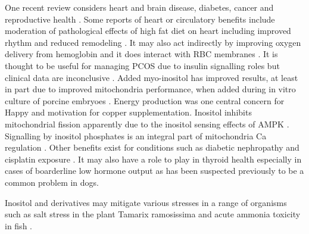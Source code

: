 One recent review considers heart and brain disease, diabetes, 
cancer and reproductive health \cite{Chhetri_Inositol_2019}.
Some reports of heart or circulatory benefits   include
moderation of pathological effects of high fat diet
on heart including improved rhythm and reduced remodeling
\cite{LABBATE2020105047}.
It may also act indirectly by improving oxygen delivery from hemoglobin
\cite{Biolo_Greferath_Siwik_Enhanced_exercise_capacity_2009}
and it does interact with RBC membranes \cite{PMID2785392}.
It is thought to be useful for managing PCOS due to insulin signalling
roles but clinical data are inconclusive \cite{10.1210/clinem/dgad762}.
Added myo-inositol has improved results, at least in part due
to improved mitochondria performance,  when added
 during in vitro culture of porcine embryoes 
\cite{Jawad_Oh_Choi_inositol_improves_developmental_2024}.
Energy production was one central concern for
Happy and motivation for copper supplementation. 
Inositol inhibits mitochondrial fission apparently due to the
inositol sensing effects of AMPK \cite{PMC8462099}.
Signalling by inositol phosphates is an integral part of mitochondria
Ca regulation 
\cite{Gilabert_Energized_mitochondria_increase_2001}
\cite{https://doi.org/10.1113/JP288022}.
Other  benefits exist for conditions such as 
diabetic nephropathy
\cite{https://doi.org/10.1002/jbt.23032}
and cisplatin exposure \cite{Xie_Wang_Li_Role_inositol_2023}
\cite{Qi_Deng_Wang_Inositol_Supplementation_Alleviates_2023}.
It may also have a role to play in thyroid health especially in 
cases of boarderline low hormone output 
\cite{PMC8143049} as has been suspected previously to be a common
problem in dogs. 



Inositol and derivatives may mitigate  various stresses in a range
of organisms such as salt stress in the plant Tamarix ramosissima
\cite{Li_Fan_Zhang_Effects_Inositol_2023}
and acute ammonia toxicity in fish 
\cite{Wang_Meng_Liu_Exogenous_inositol_ameliorates_2021}.

